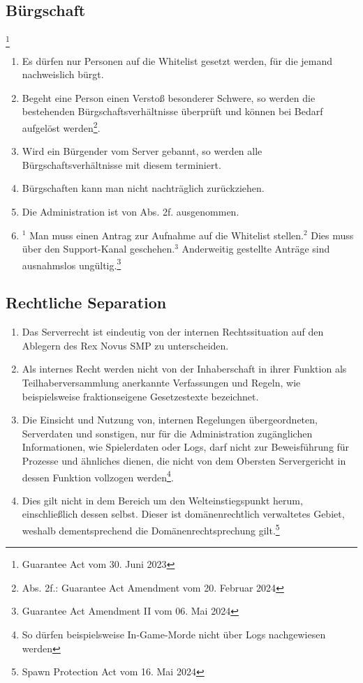 \documentclass{article}
\begin{document}
\subsection{Bürgschaft}\footnote{Guarantee Act vom 30. Juni 2023}
\begin{enumerate}[(1)]
	\item Es dürfen nur Personen auf die Whitelist gesetzt werden, für die jemand nachweislich bürgt.
	\item Begeht eine Person einen Verstoß besonderer Schwere, so werden die bestehenden Bürgschaftsverhältnisse überprüft und können bei Bedarf aufgelöst werden\footnote{Abs. 2f.: Guarantee Act Amendment vom 20. Februar 2024}.
	\item Wird ein Bürgender vom Server gebannt, so werden alle Bürgschaftsverhältnisse mit diesem terminiert.
	\item Bürgschaften kann man nicht nachträglich zurückziehen.
	\item Die Administration ist von Abs. 2f. ausgenommen.
	\item $^{1}$ Man muss einen Antrag zur Aufnahme auf die Whitelist stellen.$^{2}$ Dies muss über den Support-Kanal geschehen.$^{3}$ Anderweitig gestellte Anträge sind ausnahmslos ungültig.\footnote{Guarantee Act Amendment II vom 06. Mai 2024}
\end{enumerate}

\subsection{Rechtliche Separation}
\begin{enumerate}[(1)]
	\item Das Serverrecht ist eindeutig von der internen Rechtssituation auf den Ablegern des Rex Novus SMP zu unterscheiden.
	\item Als internes Recht werden nicht von der Inhaberschaft in ihrer Funktion als Teilhaberversammlung anerkannte Verfassungen und Regeln, wie beispielsweise fraktionseigene Gesetzestexte bezeichnet.
	\item Die Einsicht und Nutzung von, internen Regelungen übergeordneten, Serverdaten und sonstigen, nur für die Administration zugänglichen Informationen, wie Spielerdaten oder Logs, darf nicht zur Beweisführung für Prozesse und ähnliches dienen, die nicht von dem Obersten Servergericht in dessen Funktion vollzogen werden\footnote{So dürfen beispielsweise In-Game-Morde nicht über Logs nachgewiesen werden}.
	\item Dies gilt nicht in dem Bereich um den Welteinstiegspunkt herum, einschließlich dessen selbst. Dieser ist domänenrechtlich verwaltetes Gebiet, weshalb dementsprechend die Domänenrechtsprechung gilt.\footnote{Spawn Protection Act vom 16. Mai 2024}
\end{enumerate}
\end{document}
